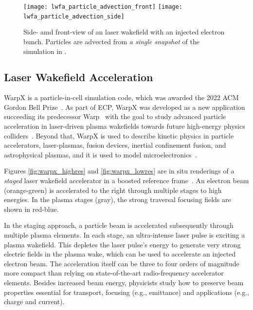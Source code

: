 \begin{figure}[ht]
  \centering
  \texttt{[image: lwfa\_particle\_advection\_front]}%
  \texttt{[image: lwfa\_particle\_advection\_side]}
  \caption{Side- amd front-view of an laser wakefield with an injected electron bunch.
  Particles are advected from \emph{a single snapshot} of the simulation in \vtkm.}
  \label{fig:lwfa_particle_advection}
\end{figure}

\subsection{Laser Wakefield Acceleration}\label{sec:warpx}

%
%
WarpX is a particle-in-cell simulation code, which was awarded the 2022 ACM Gordon Bell Prize~\cite{FedeliHuebl2022}.
As part of ECP, WarpX was developed as a new application succeeding its predecessor Warp~\cite{Vay2013} with the goal to study advanced particle acceleration in laser-driven plasma wakefields towards future high-energy physics colliders~\cite{Albert2021}.
Beyond that, WarpX is used to describe kinetic physics in particle accelerators, laser-plasmas, fusion devices, inertial confinement fusion, and astrophysical plasmas, and it is used to model microelectronics~\cite{Yao2022}.

Figures \ref{fig:warpx_highres} and \ref{fig:warpx_lowres} are in situ renderings of a \emph{staged} laser wakefield accelerator in a boosted reference frame~\cite{Vay2011}.
An electron beam (orange-green) is accelerated to the right through multiple stages to high energies.
In the plasma stages (gray), the strong traversal focusing fields are shown in red-blue.

In the staging approach, a particle beam is accelerated subsequently through multiple plasma elements.
In each stage, an ultra-intense laser pulse is exciting a plasma wakefield.
This depletes the laser pulse's energy to generate very strong electric fields in the plasma wake, which can be used to accelerate an injected electron beam.
The acceleration itself can be three to four orders of magnitude more compact than relying on state-of-the-art radio-frequency accelerator elements.
Besides increased beam energy, physicists study how to preserve beam properties essential for transport, focusing (e.g., emittance) and applications (e.g., charge and current).

